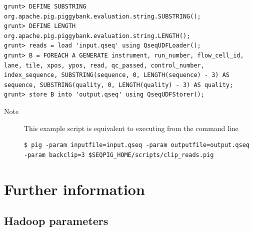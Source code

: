 \begin{lstlisting}
grunt> DEFINE SUBSTRING org.apache.pig.piggybank.evaluation.string.SUBSTRING();
grunt> DEFINE LENGTH org.apache.pig.piggybank.evaluation.string.LENGTH();
grunt> reads = load 'input.qseq' using QseqUDFLoader();
grunt> B = FOREACH A GENERATE instrument, run_number, flow_cell_id, lane, tile, xpos, ypos, read, qc_passed, control_number, index_sequence, SUBSTRING(sequence, 0, LENGTH(sequence) - 3) AS sequence, SUBSTRING(quality, 0, LENGTH(quality) - 3) AS quality;
grunt> store B into 'output.qseq' using QseqUDFStorer();
\end{lstlisting}
\begin{description}
	\item[Note] This example script is equivalent to executing from the command line
\begin{lstlisting}
$ pig -param inputfile=input.qseq -param outputfile=output.qseq -param backclip=3 $SEQPIG_HOME/scripts/clip_reads.pig
\end{lstlisting}
\end{description}

\section{Further information}

\subsection{Hadoop parameters}

